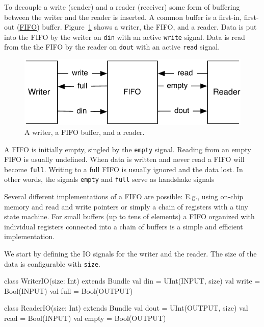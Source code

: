 \documentclass[a4paper]{article}
\newcommand{\code}[1]{{\small{\texttt{#1}}}}
\begin{document}
To decouple a write (sender) and a reader (receiver) some form
of buffering between the writer and the reader is inserted.
A common buffer is a first-in, first-out
(\href{https://en.wikipedia.org/wiki/FIFO_%28computing_and_electronics%29}{FIFO})
buffer. Figure~\ref{fig:fifo} shows a writer, the FIFO, and a reader.
Data is put into the FIFO by the writer on \code{din} with an active
\code{write} signal. Data is read from the the FIFO by the reader on
\code{dout} with an active \code{read} signal.

\begin{figure}
  \centering
  \includegraphics{figures/fifo}

  \caption{A writer, a FIFO buffer, and a reader.}
  \label{fig:fifo}
\end{figure}

A FIFO is initially empty, singled by the \code{empty} signal. Reading
from an empty FIFO is usually undefined. When data is written and never
read a FIFO will become \code{full}. Writing to a full FIFO is usually ignored
and the data lost. In other words, the signals \code{empty} and \code{full}
serve as handshake signals 

Several different implementations of a FIFO are possible: E.g., using on-chip
memory and read and write pointers or simply a chain of registers with a
tiny state machine. For small buffers (up to tens of elements) a FIFO organized
with individual registers connected into a chain of buffers is a simple and efficient
implementation.

We start by defining the IO signals for the writer and the reader. The size of
the data is configurable with \code{size}.

\begin{chisel}
class WriterIO(size: Int) extends Bundle {
  val din = UInt(INPUT, size)
  val write = Bool(INPUT)
  val full = Bool(OUTPUT)
}

class ReaderIO(size: Int) extends Bundle {
  val dout = UInt(OUTPUT, size)
  val read = Bool(INPUT)
  val empty = Bool(OUTPUT)
}
\end{chisel}
\end{document}
